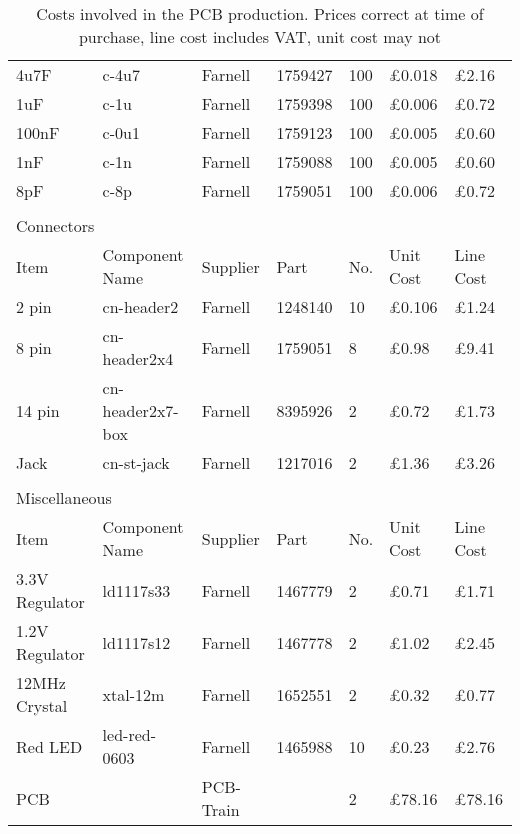 \begin{table}[H]
\begin{tabular}[c]{| l | l | l | l | l | l | l |}
		4u7F	& c-4u7	& Farnell	& 1759427	& 100	& \pounds0.018	& \pounds2.16	\\
		1uF	& c-1u	& Farnell	& 1759398	& 100	& \pounds0.006	& \pounds0.72	\\
		100nF	& c-0u1	& Farnell	& 1759123	& 100	& \pounds0.005	& \pounds0.60	\\
		1nF	& c-1n	& Farnell	& 1759088	& 100	& \pounds0.005	& \pounds0.60	\\
		8pF	& c-8p	& Farnell	& 1759051	& 100	& \pounds0.006	& \pounds0.72	\\
		\hline
		\multicolumn{7}{|l|}{}\\
		\hline
		\multicolumn{7}{|l|}{Connectors} \\
		\hline
		Item	& Component Name& Supplier & Part	& No.	& Unit Cost  & Line Cost \\
		\hline
		2 pin	& cn-header2	& Farnell	& 1248140	& 10	& \pounds0.106	& \pounds1.24	\\
		8 pin	& cn-header2x4	& Farnell	& 1759051	& 8	& \pounds0.98	& \pounds9.41	\\
		14 pin	& cn-header2x7-box	& Farnell	& 8395926	& 2	& \pounds0.72	& \pounds1.73	\\
		Jack	& cn-st-jack	& Farnell	& 1217016	& 2	& \pounds1.36	& \pounds3.26	\\
		\hline
		\multicolumn{7}{|l|}{}\\
		\hline
		\multicolumn{7}{|l|}{Miscellaneous} \\
		\hline
		Item	& Component Name& Supplier & Part	& No.	& Unit Cost  & Line Cost \\
		\hline
		3.3V Regulator	& ld1117s33	& Farnell	& 1467779	& 2	& \pounds0.71	& \pounds1.71	\\
		1.2V Regulator	& ld1117s12	& Farnell	& 1467778	& 2	& \pounds1.02	& \pounds2.45	\\
		12MHz Crystal	& xtal-12m	& Farnell	& 1652551	& 2	& \pounds0.32	& \pounds0.77	\\
		Red LED		& led-red-0603	& Farnell	& 1465988	& 10	& \pounds0.23	& \pounds2.76	\\
		PCB		&	 	& PCB-Train	& 		& 2	& \pounds78.16	& \pounds78.16	\\
		\hline
	\end{tabular}
	\caption{Costs involved in the PCB production. Prices correct at time of purchase, line cost includes VAT, unit cost may not}
	\label{tab:pcbcostings}
\end{table}
